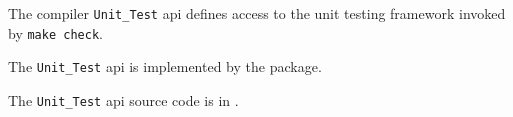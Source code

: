 
The compiler {\tt Unit\_Test} api defines access to the unit testing framework 
invoked by {\tt make check}.

The {\tt Unit\_Test} api is implemented by the  package.

The {\tt Unit\_Test} api source code is in .

